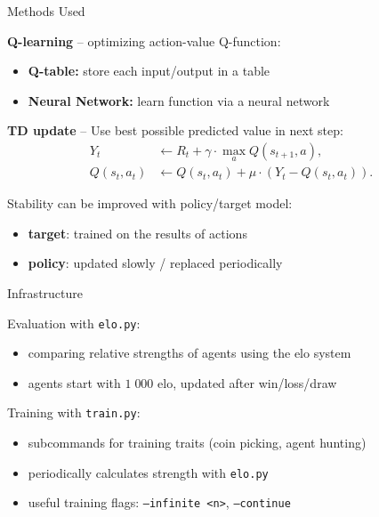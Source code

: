 \documentclass{beamer}
\begin{document}
\begin{frame}{Methods Used}
	\pause

	\textbf{Q-learning} -- optimizing action-value Q-function:
	\begin{itemize}
		\item \textbf{Q-table:} store each input/output in a table
		\item \textbf{Neural Network:} learn function via a neural network
	\end{itemize}

	\vspace{1.2em}
	\pause

	\textbf{TD update} -- Use best possible predicted value in next step:
	\begin{align*}
	     Y_t &\leftarrow R_t + \gamma \cdot \max_a Q(s_{t+1}, a),\\
	     Q(s_t, a_t) &\leftarrow Q(s_t, a_t) + \mu \cdot \left(Y_t - Q(s_t, a_t)\right).
	 \end{align*}

	\vspace{1.2em}
	\pause

	Stability can be improved with policy/target model:
	\begin{itemize}
		\item \textbf{target}: trained on the results of actions
		\item \textbf{policy}: updated slowly / replaced periodically
	\end{itemize}
\end{frame}

\begin{frame}{Infrastructure}
	\pause

	Evaluation with \texttt{elo.py}:
	\begin{itemize}
		\item comparing relative strengths of agents using the elo system
		\item agents start with $1\;000$ elo, updated after win/loss/draw
	\end{itemize}

	\vspace{1.2em}
	\pause

	Training with \texttt{train.py}:
	\begin{itemize}
		\item subcommands for training traits (coin picking, agent hunting)
		\item periodically calculates strength with \texttt{elo.py}
		\item useful training flags: \texttt{--infinite <n>}, \texttt{--continue}
	\end{itemize}
\end{frame}
\end{document}
